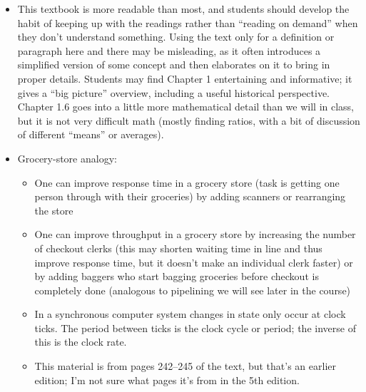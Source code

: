 \begin{frame}[fragile]
\begin{itemize}
\end{itemize}
\BNotes\ifnum{}
{
\begin{itemize}
\item This textbook is more readable than most, and students should
develop the habit of keeping up with the readings rather than
``reading on demand'' when they don't understand something. Using the
text only for a definition or paragraph here and there may be
misleading, as it often introduces a simplified version of some
concept and then elaborates on it to bring in proper details. Students
may find Chapter 1 entertaining and informative; it gives a ``big
picture'' overview, including a useful historical perspective. Chapter
1.6 goes into a little more mathematical detail than we will in class,
but it is not very difficult math (mostly finding ratios, with a bit
of discussion of different ``means'' or averages).
\item Grocery-store analogy:
	\begin{itemize}
	\item One can improve response time in a grocery store (task
	      is getting one person through with their groceries) by
             adding scanners or rearranging the store
	\item One can improve throughput in a grocery store by
	      increasing the number of checkout clerks (this may
	      shorten waiting time in line and thus improve response
	      time, but it doesn't make an individual clerk faster) or
	      by adding baggers who start bagging groceries before
	      checkout is completely done (analogous to pipelining we
	      will see later in the course)
	\item In a synchronous computer system changes in state only
	      occur at clock ticks. The period between ticks is the
	      clock cycle or period; the inverse of this is the clock
	      rate. 
	\item This material is from pages 242--245 of the text, but that's
		an earlier edition; I'm not sure what pages it's from in
		the 5th edition.
	\end{itemize}
\end{itemize}
}
\fi\ENotes
\end{frame}

